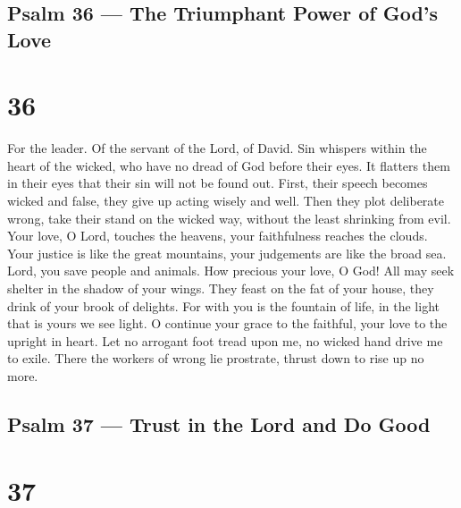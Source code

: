 \hypertarget{psalm-36-the-triumphant-power-of-gods-love}{%
\subsection{Psalm 36 --- The Triumphant Power of God's
Love}\label{psalm-36-the-triumphant-power-of-gods-love}}

\hypertarget{section-35}{%
\section{36}\label{section-35}}

For the leader. Of the servant of the Lord, of David.  Sin
whispers within the heart of the wicked, who have no dread of God before
their eyes.  It flatters them in their eyes that their sin
will not be found out.  First, their speech becomes wicked
and false, they give up acting wisely and well.  Then they
plot deliberate wrong, take their stand on the wicked way, without the
least shrinking from evil.  Your love, O Lord, touches the
heavens, your faithfulness reaches the clouds.  Your justice
is like the great mountains, your judgements are like the broad sea.
Lord, you save people and animals.  How precious your love,
O God! All may seek shelter in the shadow of your wings. 
They feast on the fat of your house, they drink of your brook of
delights.  For with you is the fountain of life, in the
light that is yours we see light.  O continue your grace to
the faithful, your love to the upright in heart.  Let no
arrogant foot tread upon me, no wicked hand drive me to exile.
 There the workers of wrong lie prostrate, thrust down to
rise up no more.

\hypertarget{psalm-37-trust-in-the-lord-and-do-good}{%
\subsection{Psalm 37 --- Trust in the Lord and Do
Good}\label{psalm-37-trust-in-the-lord-and-do-good}}

\hypertarget{section-36}{%
\section{37}\label{section-36}}

